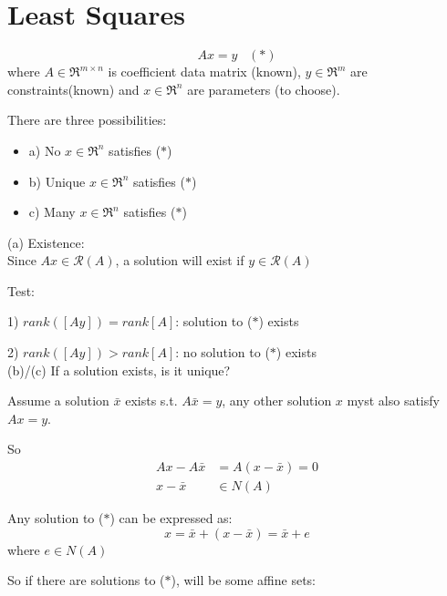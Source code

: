 



\section{Least Squares}
 
\begin{equation*}
Ax = y \,\,\,\,\,(*)
\end{equation*}
where $A\in \Re^{m\times n}$ is coefficient data matrix (known), $y\in \Re^m$ are constraints(known) and $x\in \Re^n$ are parameters (to choose).

There are three possibilities:

\begin{itemize}
	\item a) No $x\in \Re^n$ satisfies ($*$)
	
	\item b) Unique $x\in \Re^n$ satisfies ($*$)
	
	\item c) Many $x\in \Re^n$ satisfies ($*$)
\end{itemize}

(a) Existence:\\

Since $Ax\in \mathcal{R}(A)$, a solution will exist if $y\in \mathcal{R}(A)$

Test: 

1) $rank([A y]) = rank[A]$: solution to ($*$) exists

2) $rank([A y]) > rank[A]$: no solution to ($*$) exists\\

(b)/(c) If a solution exists, is it unique?

Assume a solution $\bar{x}$ exists s.t. $A\bar{x} = y$, any other solution $x$ myst also satisfy $Ax = y$. 

So 
\begin{align*}
Ax - A\bar{x} &= A(x -\bar{x}) = 0\\
x - \bar{x} &\in N(A)
\end{align*}

Any solution to ($*$) can be expressed as:
\begin{equation*}
x = \bar{x} + (x - \bar{x}) = \bar{x} + e
\end{equation*}
where $e\in N(A)$

So if there are solutions to ($*$), will be some affine sets:


